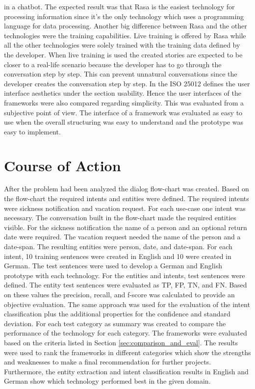 in a chatbot.
The expected result was that Rasa is the easiest technology for processing 
information since it's the only technology which uses a programming 
language for data processing.
Another big difference between Rasa and the other technologies were the 
training capabilities.
Live training is offered by Rasa while all the other technologies 
were solely trained with the training data defined by the developer.
When live training is used the created stories are expected to be closer 
to a real-life scenario because the developer has to go through the conversation 
step by step.
This can prevent unnatural conversations since the developer creates the conversation 
step by step.
In the ISO 25012\cite{iso25010} defines the user interface aesthetics under the section 
usability. 
Hence the user interfaces of the frameworks were also compared regarding simplicity.
This was evaluated from a subjective point of view.
The interface of a framework was evaluated as easy to use when the overall structuring 
was easy to understand and the prototype was easy to implement.


\section{Course of Action} %
After the problem had been analyzed the dialog flow-chart was 
created.
Based on the flow-chart the required intents and entities were defined.
The required intents were sickness notification and vacation request.
For each use-case one intent was necessary.
The conversation built in the flow-chart made the required entities visible.
For the sickness notification the name of a person and an optional 
return date were required.
The vacation request needed the name of the person and a date-span.
The resulting entities were person, date, and date-span.
For each intent, 10 training sentences were created in English and 
10 were created in German.
The test sentences were used to develop a German and English prototype 
with each technology.
For the entities and intents, test sentences were defined.
The entity test sentences were evaluated as TP, FP, TN, and FN.
Based on these values the precision, recall, and f-score was calculated 
to provide an objective evaluation.
The same approach was used for the evaluation of the intent classification
plus the additional properties for the confidence and standard deviation.
For each test category as summary was created to compare the 
performance of the technology for each category.
The frameworks were evaluated based on the criteria listed in 
Section \ref{sec:comparison_and_eval}.
The results were used to rank the frameworks in different categories 
which show the strengths and weaknesses to make a final recommendation for 
further projects.
Furthermore, the entity extraction and intent classification results in 
English and German show which technology performed best in the 
given domain.